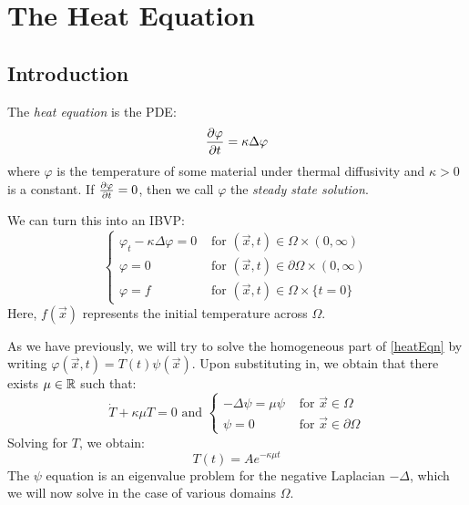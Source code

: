 \documentclass[../main.tex]{subfiles}
\begin{document}
\section{The Heat Equation} \label{heatEqnSec}
\subsection{Introduction}
The \textit{heat equation} is the PDE:
\[
  \pderiv{\varphi}{t} = \kappa \Delta \varphi
\]
where $\varphi$ is the temperature of some material under thermal diffusivity and $\kappa > 0$ is a constant.
If $\pderiv{\varphi}{t} = 0$, then we call $\varphi$ the \textit{steady state solution}.

We can turn this into an IBVP:
\begin{equation}
  \label{heatEqn}
  \begin{cases}
  \varphi_t - \kappa \Delta \varphi = 0 & \text{ for } (\vec{x}, t) \in \Omega \times (0, \infty) \\
  \varphi = 0 & \text{ for } (\vec{x}, t) \in \partial \Omega \times (0, \infty) \\
  \varphi = f & \text{ for } (\vec{x}, t) \in \Omega \times \{t = 0\}
  \end{cases}
\end{equation}
Here, $f(\vec{x})$ represents the initial temperature across $\Omega$.

As we have previously, we will try to solve the homogeneous part of \cref{heatEqn} by writing $\varphi(\vec{x}, t) = T(t)\psi(\vec{x})$.
Upon substituting in, we obtain that there exists $\mu \in \mathbb{R}$ such that:
\begin{equation} \label{heatEVP}
  \dot{T} + \kappa \mu T = 0 \text{ and } \begin{cases}
  -\Delta \psi = \mu \psi & \text{ for } \vec{x} \in \Omega \\
  \psi = 0 & \text{ for } \vec{x} \in \partial \Omega
  \end{cases}
\end{equation}
Solving for $T$, we obtain:
\[
  T(t) = Ae^{-\kappa \mu t}
\]
The $\psi$ equation is an eigenvalue problem for the negative Laplacian $-\Delta$, which we will now solve in the case of various domains $\Omega$.
\end{document}
